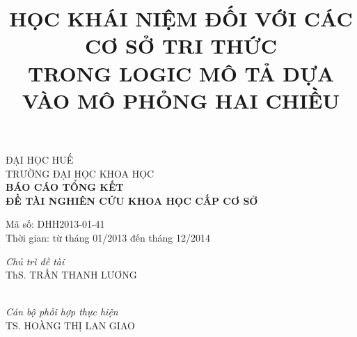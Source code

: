 \documentclass[fleqn]{beamer}
\title[Học khái niệm đối với các cơ sở tri thức trong logic mô tả dựa vào mô phỏng hai chiều]{\bf {\normalsize HỌC KHÁI NIỆM ĐỐI VỚI CÁC CƠ SỞ TRI THỨC\\ $\!\!\!$TRONG LOGIC MÔ TẢ DỰA VÀO MÔ PHỎNG HAI CHIỀU$\!\!\!$}}
\date{}
\begin{document}
\begin{frame}
\begin{center}
{\scriptsize ĐẠI HỌC HUẾ}\\
{\scriptsize TRƯỜNG ĐẠI HỌC KHOA HỌC}\\[0.7cm]
{\bf BÁO CÁO TỔNG KẾT\\[0.1cm]
	ĐỀ TÀI NGHIÊN CỨU KHOA HỌC CẤP CƠ SỞ}
\end{center}
\vspace{-3ex}
\titlepage
\vspace{-14ex}

\begin{center}
{\small Mã số: DHH2013-01-41\\
	Thời gian: từ tháng 01/2013 đến tháng 12/2014}
\end{center}

\vspace{4ex}
\begin{minipage}{0.4\textwidth}
\begin{flushleft}
\emph{\footnotesize Chủ trì đề tài}\\
{\scriptsize ThS. TRẦN THANH LƯƠNG}\\
{\ }
\end{flushleft}
\end{minipage}
\begin{minipage}{0.58\textwidth}
\begin{flushright}
\emph{\footnotesize Cán bộ phối hợp thực hiện} \\
{\scriptsize TS. HOÀNG THỊ LAN GIAO}\\
{\ }
\end{flushright}
\end{minipage}
\end{frame}
\end{document}
